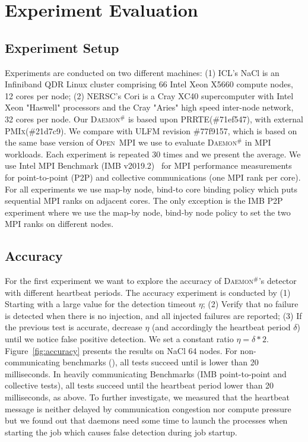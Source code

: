 \documentclass[sigconf]{acmart}
\newcommand{\prrte}[0]{\textsc{PRRTE}\xspace}
\newcommand{\pmix}[0]{\textsc{PMIx}\xspace}
\newcommand{\ompi}[0]{\textsc{Open~MPI}\xspace}
\newcommand{\ulfm}[0]{\textsc{ULFM}\xspace}
\newcommand{\mpi}[0]{\textsc{MPI}\xspace}
\newcommand{\ourwork}[0]{\textsc{Daemon}\ensuremath{^\#}\xspace}
\newcommand{\imb}[0]{\textsc{IMB}\xspace}
\begin{document}
\section{Experiment Evaluation}\label{sec:experiments}

\subsection{Experiment Setup}
Experiments are conducted on two different machines: (1) ICL's NaCl is an Infiniband QDR Linux cluster comprising 66 Intel Xeon X5660 compute nodes, 12 cores per node; (2) NERSC's Cori
is a Cray XC40 supercomputer with Intel Xeon "Haswell" processors and the Cray "Aries" high speed inter-node network, 32 cores per node. Our \ourwork is based upon \prrte (\#71ef547), with external \pmix (\#21d7c9). We compare with \ulfm revision \#77f9157, which is based on the same base version of \ompi we use to evaluate \ourwork in MPI workloads. Each experiment is repeated 30 times and we present the average. We use Intel MPI Benchmark (\imb v2019.2)~\cite{IMB} for MPI performance measurements for point-to-point (P2P) and collective communications (one \mpi rank per core). For all experiments we use map-by node, bind-to core binding policy which puts sequential MPI ranks on adjacent cores. The only exception is the \imb P2P experiment where we use 
the map-by node, bind-by node policy to set the two \mpi ranks on different nodes.

\subsection{Accuracy}
For the first experiment we want to explore the accuracy of \ourwork's detector with different heartbeat periods. 
%
The accuracy experiment is conducted by (1) Starting with a large value for the 
detection timeout $\eta$; (2) Verify that no failure is detected when there is no injection, and all injected failures are reported; (3) If the previous test is accurate, decrease $\eta$ (and accordingly the heartbeat period $\delta$) until we notice false positive detection. We set a constant ratio $\eta = \delta * 2$.
 Figure~\ref{fig:accuracy} presents the results on NaCl 64 nodes. For 
 non-communicating benchmarks (), all tests succeed 
 until \delta is lower than 20 milliseconds. In heavily communicating Benchmarks
 (\imb point-to-point and collective tests), all tests succeed until the 
  heartbeat period lower than 20 milliseconds, as above. To further investigate,
  we measured that the heartbeat message is neither delayed by communication
  congestion nor compute pressure but we found out that daemons need some time to launch the processes when starting the job which causes false detection during job startup. 
  
\end{document}
